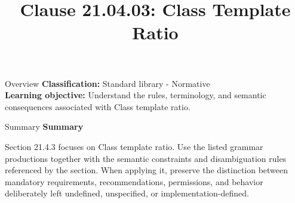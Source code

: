 \documentclass[10pt,letterpaper]{article}
\title{Clause 21.04.03: Class Template Ratio}
\author{}
\date{}
\begin{document}
\maketitle
\begin{CornellOverviewBox}{Overview}
\textbf{Classification:} Standard library - Normative\\[2pt]
\textbf{Learning objective:} Understand the rules, terminology, and semantic consequences associated with Class template ratio.
\end{CornellOverviewBox}\begin{CornellSummaryBox}{Summary}
{\sffamily\bfseries\color{Accent} Summary}\par\vspace{3pt}Section 21.4.3 focuses on Class template ratio. Use the listed grammar productions together with the semantic constraints and disambiguation rules referenced by the section. When applying it, preserve the distinction between mandatory requirements, recommendations, permissions, and behavior deliberately left undefined, unspecified, or implementation-defined.
\end{CornellSummaryBox}
\end{document}

